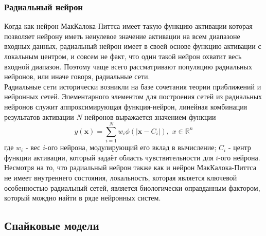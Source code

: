 \documentclass[a4paper,10pt]{article}
\begin{document}
\subsubsection{Радиальный нейрон}
\indent Когда как нейрон МакКалока-Питтса имеет такую функцию активации которая позволяет нейрону иметь ненулевое значение активации на всем  диапазоне входных данных, радиальный нейрон имеет в своей основе функцию активации с локальным центром, и совсем не факт, что один такой нейрон охватит весь входной диапазон. Поэтому чаще всего рассматривают популяцию радиальных нейронов, или иначе говоря, радиальные сети.\\ 
\indent Радиальные сети исторически возникли на базе сочетания теории приближений и нейронных сетей. Элементарного элементом для построения сетей из радиальных нейронов служит аппроксимирующая функция-нейрон, линейная комбинация результатов активации $N$ нейронов выражается значением функции
   \begin{equation*}\label{eq:rbf}
   y(\boldsymbol{x}) = \sum_{i=1}^{N}w_{i}\phi(|\boldsymbol{x}-C_{i}|),\,\, x\in \mathbb{R}^n
   \end{equation*}
где $w_{i}$ - вес $i$-ого нейрона, модулирующий его вклад в вычисление; $C_{i}$ - центр функции активации, который задаёт область чувствительности для $i$-ого нейрона.\\
\indent Несмотря на то, что радиальный нейрон также как и нейрон МакКалока-Питтса не имеет внутреннего состояния, локальность, которая является ключевой особенностью радиальный сетей, является биологически оправданным фактором, который мождно найти в ряде нейронных систем.\\

\subsection{Спайковые модели}   
\end{document}

